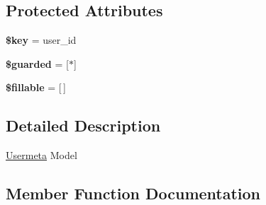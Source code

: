 \subsection*{Protected Attributes}
\begin{DoxyCompactItemize}
\item 
\hypertarget{classDMA_1_1Friends_1_1Models_1_1Usermeta_a39190deb0a2302c8edab3b5eaa70b78f}{}{\bfseries \$key} = \textquotesingle{}user\+\_\+id\textquotesingle{}\label{classDMA_1_1Friends_1_1Models_1_1Usermeta_a39190deb0a2302c8edab3b5eaa70b78f}

\item 
\hypertarget{classDMA_1_1Friends_1_1Models_1_1Usermeta_a95d74f02cd302db9566b8da29154e82d}{}{\bfseries \$guarded} = \mbox{[}\textquotesingle{}$\ast$\textquotesingle{}\mbox{]}\label{classDMA_1_1Friends_1_1Models_1_1Usermeta_a95d74f02cd302db9566b8da29154e82d}

\item 
\hypertarget{classDMA_1_1Friends_1_1Models_1_1Usermeta_a1dca0217848634cab6e2ad205804e351}{}{\bfseries \$fillable} = \mbox{[}$\,$\mbox{]}\label{classDMA_1_1Friends_1_1Models_1_1Usermeta_a1dca0217848634cab6e2ad205804e351}

\end{DoxyCompactItemize}


\subsection{Detailed Description}
\hyperlink{classDMA_1_1Friends_1_1Models_1_1Usermeta}{Usermeta} Model 

\subsection{Member Function Documentation}
\hypertarget{classDMA_1_1Friends_1_1Models_1_1Usermeta_a9cfb688f15d66ee5a34c6437316d5d71}{}
